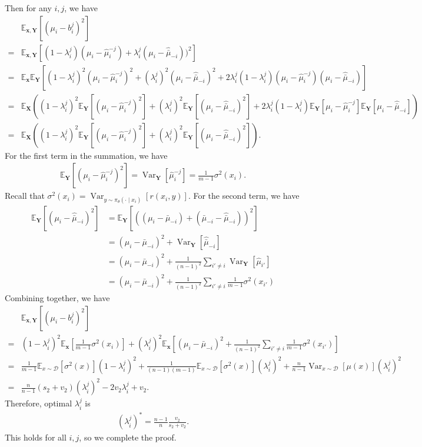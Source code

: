 \documentclass{article}
\renewcommand{\vec}[1]{\mathbf{#1}}
\theoremstyle{plain}
\theoremstyle{definition}
\theoremstyle{remark}
\newcommand{\cD}{\mathcal{D}}
\newcommand{\E}{\mathbb{E}}
\DeclareMathOperator{\var}{Var}
\newcommand{\Bp}[1]{(#1)}
\newcommand{\Mp}[1]{[#1]}
\begin{document}
Then for any $i,j$, we have 
\begin{align*}
&\textstyle \E_{\vec x, \vec Y }[(\mu_i-b_i^j)^2] \\
=& \textstyle \E_{\vec x, \vec Y }[(1-\lambda_i^j)(\mu_i-\hat \mu_i^{-j})+\lambda_i^j (\mu_i-\hat{\bar \mu}_{-i}))^2] \\
=& \textstyle \E_{\vec x}\E_{\vec Y }\Mp{(1-\lambda_i^j)^2(\mu_i-\hat \mu_i^{-j})^2+(\lambda_i^j)^2 (\mu_i-\hat{\bar \mu}_{-i})^2+2\lambda_i^j(1-\lambda_i^j)(\mu_i-\hat \mu_i^{-j})(\mu_i-\hat{\bar \mu}_{-i})} \\
= & \textstyle \E_{\vec X}\Bp{(1-\lambda_i^j)^2\E_{\vec Y}\Mp{(\mu_i-\hat \mu_i^{-j})^2}+(\lambda_i^j)^2\E_{\vec Y}\Mp{(\mu_i-\hat{\bar \mu}_{-i})^2} + 2\lambda_i^j(1-\lambda_i^j)\E_{\vec Y}\Mp{\mu_i-\hat \mu_i^{-j}}\E_{\vec Y}\Mp{\mu_i-\hat{\bar \mu}_{-i}} } \\
= & \textstyle \E_{\vec X}\Bp{(1-\lambda_i^j)^2\E_{\vec Y}\Mp{(\mu_i-\hat \mu_i^{-j})^2}+(\lambda_i^j)^2\E_{\vec Y}\Mp{(\mu_i-\hat{\bar \mu}_{-i})^2}}.
\end{align*}
For the first term in the summation, we have
\begin{align*}
\textstyle \E_{\vec Y}\Mp{(\mu_i-\hat \mu_i^{-j})^2} = \var_{\vec Y}[\hat \mu_i^{-j}] = \frac{1}{m-1}\sigma^2(x_i).
\end{align*}
Recall that $\sigma^2(x_i) = \var_{y\sim \pi_\theta(\cdot\mid x_i)}[r(x_i,y)]$.
For the second term, we have
\begin{align*}
\textstyle \E_{\vec Y}\Mp{(\mu_i-\hat{\bar \mu}_{-i})^2}
& = \textstyle \E_{\vec Y}\Mp{((\mu_i-\bar \mu_{-i})+(\bar\mu_{-i}-\hat{\bar \mu}_{-i}))^2} \\
& = \textstyle (\mu_i-\bar \mu_{-i})^2+ \var_{\vec Y}[\hat{\bar \mu}_{-i}] \\
& = \textstyle (\mu_i-\bar \mu_{-i})^2 + \frac{1}{(n-1)^2}\sum_{i'\neq i}\var_{\vec Y}[\hat \mu_{i'}] \\
& = \textstyle (\mu_i-\bar \mu_{-i})^2 + \frac{1}{(n-1)^2}\sum_{i'\neq i}\frac{1}{m-1}\sigma^2(x_{i'})
\end{align*}
Combining together, we have
\begin{align*}
&\textstyle \E_{\vec x, \vec Y }[(\mu_i-b_i^j)^2] \\
=&\textstyle (1-\lambda_i^j)^2\E_{\vec x}\Mp{\frac{1}{m-1}\sigma^2(x_i) }+(\lambda_i^j)^2\E_{\vec x}\Mp{ (\mu_i-\bar \mu_{-i})^2 + \frac{1}{(n-1)^2}\sum_{i'\neq i}\frac{1}{m-1}\sigma^2(x_{i'}) } \\
= &\textstyle \frac{1}{m-1}\E_{x\sim\cD}[\sigma^2(x)](1-\lambda_i^j)^2+\frac{1}{(n-1)(m-1)}\E_{x\sim\cD}[\sigma^2(x)](\lambda_i^j)^2 + \frac{n}{n-1}\var_{x\sim\cD}[\mu(x)](\lambda_i^j)^2 \\
= & \textstyle \frac{n}{n-1}(s_2+v_2)(\lambda_i^j)^2-2v_2\lambda_i^j+v_2.
\end{align*}
Therefore, optimal $\lambda_i^j$ is 
\begin{align*}
\textstyle (\lambda_i^j)^* = \frac{n-1}{n} \frac{v_2}{s_2+v_2}.
\end{align*}
This holds for all $i,j$, so we complete the proof.
\end{document}
